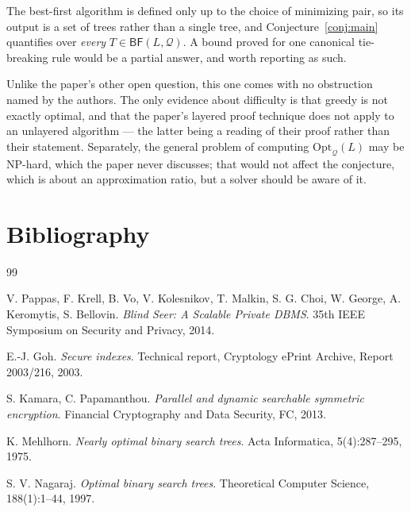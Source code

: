 \documentclass{conjura-conjecture}
\newcommand{\Qd}{\mathcal{Q}}
\newcommand{\Opt}{\mathrm{Opt}}
\newcommand{\BF}{\mathsf{BF}}
\begin{document}
\begin{remark}\label{rem:ties}
The best-first algorithm is defined only up to the choice of minimizing
pair, so its output is a set of trees rather than a single tree, and
Conjecture~\ref{conj:main} quantifies over \emph{every}
$T \in \BF(L,\Qd)$. A bound proved for one canonical tie-breaking rule
would be a partial answer, and worth reporting as such.
\end{remark}

\begin{remark}\label{rem:difficulty}
Unlike the paper's other open question, this one comes with no
obstruction named by the authors. The only evidence about difficulty is
that greedy is not exactly optimal, and that the paper's layered proof
technique does not apply to an unlayered algorithm --- the latter being a
reading of their proof rather than their statement. Separately, the
general problem of computing $\Opt_{\Qd}(L)$ may be NP-hard, which the
paper never discusses; that would not affect the conjecture, which is
about an approximation ratio, but a solver should be aware of it.
\end{remark}

\section{Bibliography}

\begin{conjurabibliography}{99}

V. Pappas, F. Krell, B. Vo, V. Kolesnikov, T. Malkin, S. G. Choi,
W. George, A. Keromytis, S. Bellovin.
\emph{Blind Seer: A Scalable Private DBMS}.
35th IEEE Symposium on Security and Privacy, 2014.

E.-J. Goh.
\emph{Secure indexes}.
Technical report, Cryptology ePrint Archive, Report 2003/216, 2003.

S. Kamara, C. Papamanthou.
\emph{Parallel and dynamic searchable symmetric encryption}.
Financial Cryptography and Data Security, FC, 2013.

K. Mehlhorn.
\emph{Nearly optimal binary search trees}.
Acta Informatica, 5(4):287--295, 1975.

S. V. Nagaraj.
\emph{Optimal binary search trees}.
Theoretical Computer Science, 188(1):1--44, 1997.

\end{conjurabibliography}
\end{document}
